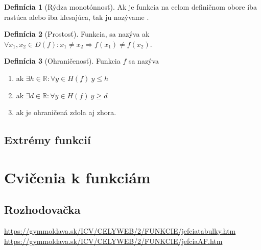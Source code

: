 \documentclass[12pt, twopage]{article}
\theoremstyle{definition}
\newtheorem{definition}{Definícia}
\begin{document}
 	\begin{definition}[Rýdza monotónnosť]
 		Ak je funkcia na celom definičnom obore iba rastúca alebo iba klesajúca, tak ju nazývame .
 	\end{definition}
 	
 	\begin{definition}[Prostosť]
 		Funkcia, sa nazýva  ak $\forall x_1, x_2 \in D(f): x_1 \neq x_2 \Rightarrow f(x_1) \neq f(x_2)$.
 	\end{definition}
 	
 	\begin{definition}[Ohraničenosť]
 		Funkcia $f$ sa nazýva \\
 		\begin{enumerate}
 			\item {} ak $\exists h \in \mathbb{R}: \forall y \in H(f) ~ y \le h$
 			\item {} ak $\exists d \in \mathbb{R}: \forall y \in H(f) ~ y \ge d$
 			\item {} ak je ohraničená zdola aj zhora.
 			
 		\end{enumerate}
 	\end{definition}
 	
 	\subsection{Extrémy funkcií}
 	
 	
	
	\section{Cvičenia k funkciám}
	
	\subsection{Rozhodovačka}
	\url{https://gymmoldava.sk/ICV/CELYWEB/2/FUNKCIE/jefciatabulky.htm}\\
	\url{https://gymmoldava.sk/ICV/CELYWEB/2/FUNKCIE/jefciaAF.htm}\\
	
\end{document}
